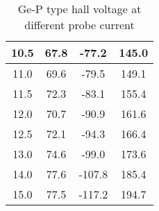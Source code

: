 \begin{table}[h]
{\begin{tabular}{|c|c|c|c|}
    10.5 & 67.8 & -77.2 & 145.0 \\ \hline
    11.0 & 69.6 & -79.5 & 149.1 \\ \hline
    11.5 & 72.3 & -83.1 & 155.4 \\ \hline
    12.0 & 70.7 & -90.9 & 161.6 \\ \hline
    12.5 & 72.1 & -94.3 & 166.4 \\ \hline
    13.0 & 74.6 & -99.0 & 173.6 \\ \hline
    14.0 & 77.6 & -107.8 & 185.4 \\ \hline
    15.0 & 77.5 & -117.2 & 194.7 \\ \hline
    \end{tabular}%
    }
    \caption{Ge-P type hall voltage at different probe current}
    \label{tab:3}
\end{table}
